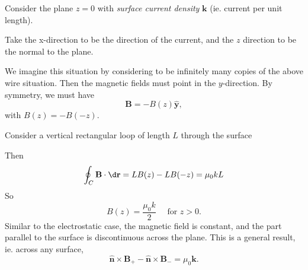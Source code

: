 \documentclass[a4paper]{article}
\begin{document}
\begin{eg}
  Consider the plane $z = 0$ with \emph{surface current density} $\mathbf{k}$ (ie. current per unit length).
  \begin{center}
  \end{center}
  Take the x-direction to be the direction of the current, and the $z$ direction to be the normal to the plane.

  We imagine this situation by considering to be infinitely many copies of the above wire situation. Then the magnetic fields must point in the $y$-direction. By symmetry, we must have
  \[
    \mathbf{B} = -B(z) \hat{\mathbf{y}},
  \]
  with $B(z) = -B(-z)$.

  Consider a vertical rectangular loop of length $L$ through the surface
  \begin{center}
  \end{center}
  Then
  \[
    \oint_C \mathbf{B}\cdot \d \mathbf{r} = LB(z) - LB(-z) = \mu_0 kL
  \]
  So
  \[
    B(z) = \frac{\mu_0 k}{2}\quad\text{ for }z > 0.
  \]
  Similar to the electrostatic case, the magnetic field is constant, and the part parallel to the surface is discontinuous across the plane. This is a general result, ie. across any surface,
  \[
    \hat {\mathbf{n}} \times \mathbf{B}_+ - \hat{\mathbf{n}}\times \mathbf{B}_{-} = \mu_0 \mathbf{k}.
  \]
\end{eg}
\end{document}
